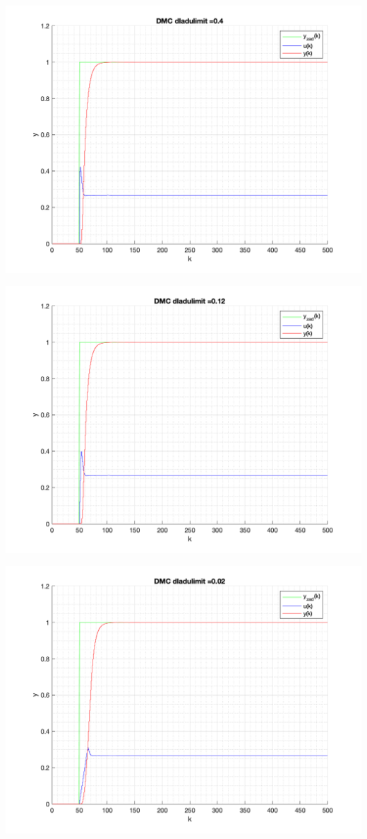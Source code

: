 \documentclass[a4paper, 11pt]{article}
\begin{document}
\begin{enumerate}
 \includegraphics[width=\linewidth]{./ModelsP6_dulimit/P4_DMC_dulimit_0_4_png.png} 
 
 \includegraphics[width=\linewidth]{./ModelsP6_dulimit/P4_DMC_dulimit_0_12_png.png} 
 
 \includegraphics[width=\linewidth]{./ModelsP6_dulimit/P4_DMC_dulimit_0_02_png.png} 
 

\end{enumerate}
\end{document}
